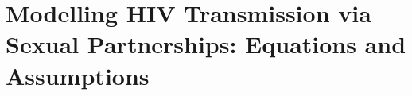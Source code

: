 \chapter{Modelling HIV Transmission via Sexual Partnerships: Equations and Assumptions}\label{foi}





\printchapterbibliography
